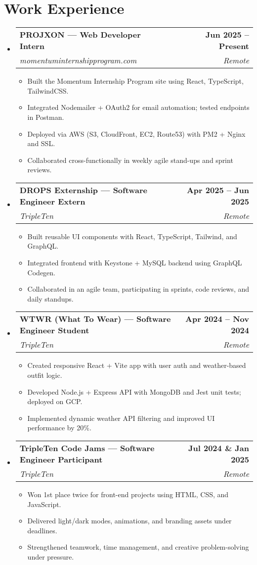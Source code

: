 \documentclass[letterpaper,11pt]{article}
\makeatletter
\newcommand{\resumeItem}[1]{
  \item\small{
    {#1 \vspace{0pt}}
  }
}
\newcommand{\resumeSubheading}[4]{
  \vspace{-2pt}\item
    \begin{tabular*}{1.0\textwidth}[t]{l@{\extracolsep{\fill}}r}
      \textbf{#1} & \textbf{\small #2} \\
      \textit{\small#3} & \textit{\small #4} \\
    \end{tabular*}\vspace{-7pt}
}
\newcommand{\resumeSubHeadingListStart}{\begin{itemize}[leftmargin=0.0in, label={}]}
\newcommand{\resumeSubHeadingListEnd}{\end{itemize}}\vspace{0pt}
\newcommand{\resumeItemListStart}{\begin{itemize}}
\newcommand{\resumeItemListEnd}{\end{itemize}\vspace{-5pt}}
\makeatother
\begin{document}
\section{Work Experience}
\resumeSubHeadingListStart

\resumeSubheading
 {PROJXON — Web Developer Intern}{Jun 2025 -- Present}
  {momentuminternshipprogram.com}{Remote}
\resumeItemListStart
  \resumeItem{Built the Momentum Internship Program site using React, TypeScript, TailwindCSS.}
  \resumeItem{Integrated Nodemailer + OAuth2 for email automation; tested endpoints in Postman.}
  \resumeItem{Deployed via AWS (S3, CloudFront, EC2, Route53) with PM2 + Nginx and SSL.}
  \resumeItem{Collaborated cross-functionally in weekly agile stand-ups and sprint reviews.}
\resumeItemListEnd



\resumeSubheading
  {DROPS Externship — Software Engineer Extern}{Apr 2025 -- Jun 2025}
  {TripleTen}{Remote}
  \vspace{-2pt}
\resumeItemListStart
  \resumeItem{Built reusable UI components with React, TypeScript, Tailwind, and GraphQL.}
  \resumeItem{Integrated frontend with Keystone + MySQL backend using GraphQL Codegen.}
  \resumeItem{Collaborated in an agile team, participating in sprints, code reviews, and daily standups.}
\resumeItemListEnd


\resumeSubheading
  {WTWR (What To Wear) — Software Engineer Student}{Apr 2024 -- Nov 2024}
  {TripleTen}{Remote}
  \vspace{-2pt}
\resumeItemListStart
  \resumeItem{Created responsive React + Vite app with user auth and weather-based outfit logic.}
  \resumeItem{Developed Node.js + Express API with MongoDB and Jest unit tests; deployed on GCP.}
  \resumeItem{Implemented dynamic weather API filtering and improved UI performance by 20\%.}
\resumeItemListEnd



\resumeSubheading
  {TripleTen Code Jams — Software Engineer Participant}{Jul 2024 \& Jan 2025}
  {TripleTen}{Remote}
  \vspace{-2pt}
\resumeItemListStart
  \resumeItem{Won 1st place twice for front-end projects using HTML, CSS, and JavaScript.}
  \resumeItem{Delivered light/dark modes, animations, and branding assets under deadlines.}
  \resumeItem{Strengthened teamwork, time management, and creative problem-solving under pressure.}
\resumeItemListEnd


\resumeSubHeadingListEnd
    
\end{document}

